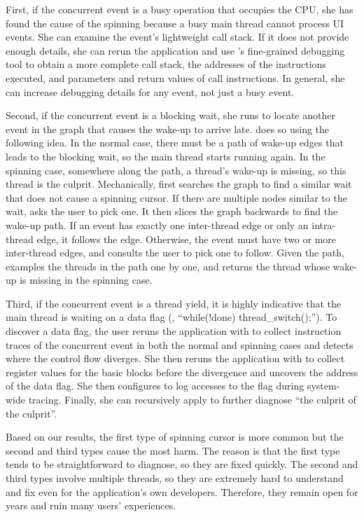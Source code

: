 First, if the concurrent event is a busy operation that occupies the CPU, she
has found the cause of the spinning because a busy main thread cannot process
UI events.  She can examine the event's lightweight call stack.  If it does not
provide enough details, she can rerun the application and use \xxx's
fine-grained debugging tool to obtain a more complete call stack, the addresses
of the instructions executed, and parameters and return values of call
instructions.  In general, she can increase debugging details for any event,
not just a busy event.

Second, if the concurrent event is a blocking wait, she runs \xxx to locate
another event in the graph that causes the wake-up to arrive late. \xxx does so
using the following idea.  In the normal case, there must be a path of wake-up
edges that leads to the blocking wait, so the main thread starts running again.
In the spinning case, somewhere along the path, a thread's wake-up is missing,
so this thread is the culprit.  Mechanically, \xxx first searches the graph to
find a similar wait that does not cause a spinning cursor.  If there are
multiple nodes similar to the wait, \xxx asks the user to pick one.  It then
slices the graph backwards to find the wake-up path.  If an event has exactly
one inter-thread edge or only an intra-thread edge, it follows the edge.
Otherwise, the event must have two or more inter-thread edges, and \xxx
consults the user to pick one to follow.  Given the path, \xxx examples the
threads in the path one by one, and returns the thread whose wake-up is missing
in the spinning case.

Third, if the concurrent event is a thread yield, it is highly indicative that
the main thread is waiting on a data flag (\eg, ``while(!done)
thread\_switch();'').  To discover a data flag, the user reruns the application
with \xxx to collect instruction traces of the concurrent event in both the
normal and spinning cases and detects where the control flow diverges.  She
then reruns the application with \xxx to collect register values for the basic
blocks before the divergence and uncovers the address of the data flag.  She
then configures \xxx to log accesses to the flag during system-wide tracing.
Finally, she can recursively apply \xxx to further diagnose ``the culprit of
the culprit''. 

Based on our results, the first type of spinning cursor is more common but the
second and third types cause the most harm.  The reason is that the first type
tends to be straightforward to diagnose, so they are fixed quickly.  The second
and third types involve multiple threads, so they are extremely hard to
understand and fix even for the application's own developers.  Therefore, they
remain open for years and ruin many users' experiences.

